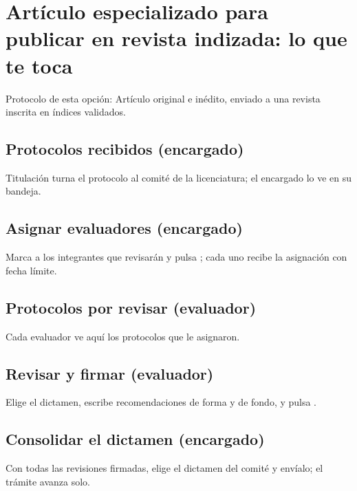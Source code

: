 \section{Artículo especializado para publicar en revista indizada: lo que te toca}
Protocolo de esta opción: Artículo original e inédito, enviado a una revista inscrita en índices validados.
\subsection{Protocolos recibidos (encargado)}
Titulación turna el protocolo al comité de la licenciatura; el encargado lo ve en su bandeja.
\subsection{Asignar evaluadores (encargado)}
Marca a los integrantes que revisarán y pulsa ; cada uno recibe la asignación con fecha límite.
\subsection{Protocolos por revisar (evaluador)}
Cada evaluador ve aquí los protocolos que le asignaron.
\subsection{Revisar y firmar (evaluador)}
Elige el dictamen, escribe recomendaciones de forma y de fondo, y pulsa .
\subsection{Consolidar el dictamen (encargado)}
Con todas las revisiones firmadas, elige el dictamen del comité y envíalo; el trámite avanza solo.
